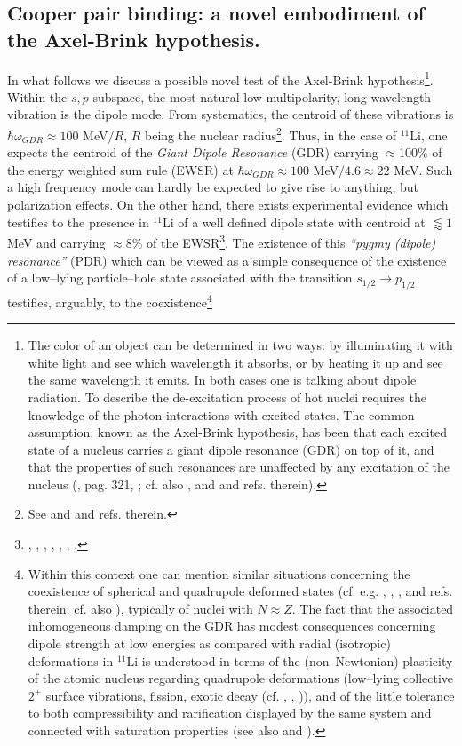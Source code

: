 \subsection{Cooper pair binding: a novel embodiment of the Axel-Brink hypothesis.}\label{sect1F1}
In what follows we discuss a possible novel test of the Axel-Brink hypothesis\footnote{The color of an object can be determined in two ways: by illuminating it with white light and see which wavelength it absorbs, or by heating it up and see the same wavelength it emits. In both cases one is talking about dipole radiation. To describe the de-excitation process of hot nuclei requires the knowledge of the photon interactions with excited states. The common assumption, known as the Axel-Brink hypothesis, has been that each excited state of a nucleus carries a giant dipole resonance (GDR) on top of it, and that the properties of such resonances are unaffected by any excitation of the nucleus (\cite{Brink:55}, \cite{Lynn:68} pag. 321, \cite{Axel:62}; cf. also \cite{Bertsch:86}, \cite{Bortignon:98} and \cite{Martin:17} and refs. therein).}. Within the $s,p$ subspace, the most natural low multipolarity, long wavelength vibration is the dipole mode. From systematics, the centroid of these vibrations is $\hbar \omega_{GDR}\approx 100$ MeV$/R$, $R$ being the nuclear radius\footnote{See \cite{Bohr:75} \cite{Bortignon:98} and \cite{Bertsch:05} and refs. therein.}. Thus, in the case of $^{11}$Li, one expects the centroid of the \textit{Giant Dipole Resonance} (GDR) carrying $\approx$100\% of the energy weighted sum rule (EWSR) at $\hbar \omega_{GDR}\approx 100$ MeV$/4.6\approx 22$ MeV. Such a high frequency mode can hardly be expected to give rise to anything, but polarization effects. On the other hand, there exists experimental evidence which testifies to the presence in $^{11}$Li of a well defined dipole state with centroid at $\lessapprox1$ MeV and carrying $\approx 8$\% of the EWSR\footnote{\cite{Zinser:97}, \cite{Nakamura:06}, \cite{Shimoura:95}, \cite{Ieki:93}, \cite{Sackett:93}, \cite{Kanungo:15}, \cite{Kobayashi:89}.}. The existence of this \textit{``pygmy (dipole) resonance''} (PDR) which can be viewed as a simple consequence of the existence of a low--lying particle--hole state associated with the transition $s_{1/2}\rightarrow p_{1/2}$ testifies, arguably, to the coexistence\footnote{Within this context one can mention similar situations concerning the coexistence of spherical and quadrupole deformed states (cf. e.g. \cite{Wimmer:10}, \cite{Federman:65}, \cite{Federman:66}, \cite{Donau:67} and refs. therein; cf. also \cite{Bohr:63}), typically of nuclei with $N\approx Z$. The fact that the associated inhomogeneous damping on the GDR has modest consequences concerning dipole strength at low energies as compared with radial (isotropic) deformations in $^{11}$Li is understood in terms of the (non--Newtonian) plasticity of the atomic nucleus regarding quadrupole deformations (low--lying collective $2^+$ surface vibrations, fission, exotic decay (cf. \cite{Barranco:88}, \cite{Barranco:89,Bertsch:88b}, \cite{Bertsch:87})), and of the little tolerance to both compressibility and rarification displayed by the same system and connected with saturation properties (see also \cite{Broglia:19} and \cite{Broglia:19b}).} 
